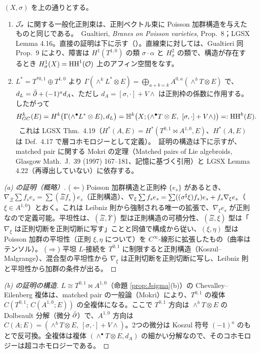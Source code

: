 \begin{prop}[一般化正則束 $=$ Poisson 加群、および Dolbeault モデル]\label{prop:ident}
$(X,\sigma)$ を上の通りとする。
\begin{enumerate}
\item[(a)] $\mathcal J_\sigma$ に関する一般化正則束は、正則ベクトル束に Poisson 加群構造を与えたものと同じである。\tC\ Gualtieri, \emph{Branes on Poisson varieties}, Prop.\ 8；LGSX Lemma 4.16。直接の証明は下に示す（\tP）。直線束に対しては、Gualtieri 同 Prop.\ 9 により、障害は $H^1(T^{1,0})$ の類 $\sigma\cdot\alpha$ と $H^2_\sigma$ の類で、構造が存在するとき $H^1_\sigma(X)=\mathrm{HH}^1(\mathcal O)$ 上のアフィン空間をなす。\tC
\item[(b)] $L^*=T^{*0,1}\oplus T^{1,0}$ より $\Gamma(\wedge^kL^*\otimes E)=\bigoplus_{a+b=k}A^{0,a}(\wedge^bT\otimes E)$ で、$d_L=\bar\partial+(-1)^ad_A$、ただし $d_A=[\sigma,\cdot]+V\wedge$ は正則枠の係数に作用する。したがって
\[H^k_{GC}(E)=H^k\bigl(\Gamma(\wedge^\bullet L^*\otimes E),d_L\bigr)=\mathbb H^k\bigl(X;(\wedge^\bullet T\otimes E,\ [\sigma,\cdot]+V\wedge)\bigr)=:\HH^k(E).\]
\tC\ これは LGSX Thm.\ 4.19（$H^*(A,E)=H^*(T^{0,1}\bowtie A^{1,0},E)$、$H^*(A,E)$ は Def.\ 4.17 で層コホモロジーとして定義）。\tP\ 証明の構造は下に示すが、matched pair に関する Mokri の定理（Matched pairs of Lie algebroids, Glasgow Math.\ J.\ 39 (1997) 167--181、記憶に基づく引用\tQ）と LGSX Lemma 4.22（再導出していない）に依存する。
\end{enumerate}
\end{prop}
\begin{proof}[(a) の証明（概略）]
($\Leftarrow$) Poisson 加群構造と正則枠 $\{e_s\}$ があるとき、$\nabla_{\bar\Xi}\sum f_se_s=\sum(\bar\Xi f_s)e_s$（正則構造）、$\nabla_\xi\sum f_se_s=\sum((\sigma^\sharp\xi)f_s)e_s+f_s\nabla_\xi e_s$（$\xi\in A^{1,0}$）とおく。これは Leibniz 則から強制される唯一の拡張で、$\nabla_\xi e_s$ が正則なので定義可能。平坦性は、$(\bar\Xi,\bar\Upsilon)$ 型は正則構造の可積分性、$(\bar\Xi,\xi)$ 型は「$\nabla_\xi$ は正則切断を正則切断に写す」ことと同値で構成から従い、$(\xi,\eta)$ 型は Poisson 加群の平坦性（正則 $\xi,\eta$ について）を $C^\infty$-線形に拡張したもの（曲率はテンソル）。
($\Rightarrow$) 平坦 $L$-接続を $T^{0,1}$ に制限すると正則構造（Koszul--Malgrange）、混合型の平坦性から $\nabla_\xi$ は正則切断を正則切断に写し、Leibniz 則と平坦性から加群の条件が出る。\qedhere
\end{proof}
\begin{proof}[(b) の証明の構造]
$L\cong T^{0,1}\bowtie A^{1,0}$（命題 \ref{prop:Jsigma}(b)）の Chevalley--Eilenberg 複体は、matched pair の一般論（Mokri）により、$T^{0,1}$ の複体 $C(T^{0,1};\,C(A^{1,0};E))$ の全複体になる。ここで $T^{0,1}$ 方向は $\wedge^bT\otimes E$ の Dolbeault 分解（微分 $\bar\partial$）で、$A^{1,0}$ 方向は $C(A;E)=(\wedge^bT\otimes E,\ [\sigma,\cdot]+V\wedge)$。2つの微分は Koszul 符号 $(-1)^a$ のもとで反可換。全複体は複体 $(\wedge^\bullet T\otimes E,d_A)$ の細かい分解なので、そのコホモロジーは超コホモロジーである。\qedhere
\end{proof}

